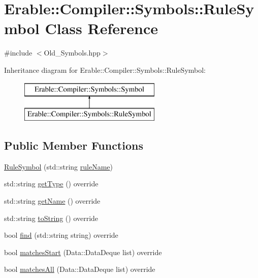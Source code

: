 \hypertarget{class_erable_1_1_compiler_1_1_symbols_1_1_rule_symbol}{}\section{Erable\+::Compiler\+::Symbols\+::Rule\+Symbol Class Reference}
\label{class_erable_1_1_compiler_1_1_symbols_1_1_rule_symbol}


{\ttfamily \#include $<$Old\+\_\+\+Symbols.\+hpp$>$}

Inheritance diagram for Erable\+::Compiler\+::Symbols\+::Rule\+Symbol\+:\begin{figure}[H]
\begin{center}
\leavevmode
\includegraphics[height=2.000000cm]{class_erable_1_1_compiler_1_1_symbols_1_1_rule_symbol}
\end{center}
\end{figure}
\subsection*{Public Member Functions}
\begin{DoxyCompactItemize}
\item 
\mbox{\hyperlink{class_erable_1_1_compiler_1_1_symbols_1_1_rule_symbol_af75295d9b0da7b246e1e28e662973940}{Rule\+Symbol}} (std\+::string \mbox{\hyperlink{class_erable_1_1_compiler_1_1_symbols_1_1_rule_symbol_a776f254959afc7fe4f4865f15673d5b8}{rule\+Name}})
\item 
std\+::string \mbox{\hyperlink{class_erable_1_1_compiler_1_1_symbols_1_1_rule_symbol_a83de7b4d8a52eb6da9298fb19f020d49}{get\+Type}} () override
\item 
std\+::string \mbox{\hyperlink{class_erable_1_1_compiler_1_1_symbols_1_1_rule_symbol_a5f6cb5a2fc49bc62cc61035cc99464ca}{get\+Name}} () override
\item 
std\+::string \mbox{\hyperlink{class_erable_1_1_compiler_1_1_symbols_1_1_rule_symbol_a068e32fb9ed0059c3da44fe47402a084}{to\+String}} () override
\item 
bool \mbox{\hyperlink{class_erable_1_1_compiler_1_1_symbols_1_1_rule_symbol_a7af57723a2a59dbccf8cbe409f019a10}{find}} (std\+::string string) override
\item 
bool \mbox{\hyperlink{class_erable_1_1_compiler_1_1_symbols_1_1_rule_symbol_a965c2e3ba84c2e93c5ebbce5003b721b}{matches\+Start}} (Data\+::\+Data\+Deque list) override
\item 
bool \mbox{\hyperlink{class_erable_1_1_compiler_1_1_symbols_1_1_rule_symbol_a690e797889b403487385955dc3fe7501}{matches\+All}} (Data\+::\+Data\+Deque list) override
\end{DoxyCompactItemize}

